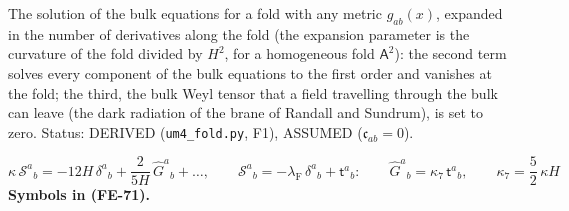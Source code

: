 \documentclass[
  10pt,
]{article}
\begin{document}
The solution of the bulk equations for a fold with any metric
\(\hat g_{ab}(x)\), expanded in the number of derivatives along the fold
(the expansion parameter is the curvature of the fold divided by
\(H^2\), for a homogeneous fold \(\mathsf{A}^2\)): the second term
solves every component of the bulk equations to the first order and
vanishes at the fold; the third, the bulk Weyl tensor that a field
travelling through the bulk can leave (the dark radiation of the brane
of Randall and Sundrum), is set to zero. Status: DERIVED
(\texttt{um4\_fold.py}, F1), ASSUMED (\(\mathfrak{c}_{ab} = 0\)).

\[
\kappa\,\mathcal{S}^a{}_b = -12H\,\delta^a{}_b + \frac{2}{5H}\,\hat G^a{}_b + \dots,\qquad
\mathcal{S}^a{}_b = -\lambda_{\mathrm{F}}\,\delta^a{}_b + \mathsf{t}^a{}_b:\qquad
\hat G^a{}_b = \kappa_7\,\mathsf{t}^a{}_b,\qquad \kappa_7 = \frac52\,\kappa H \tag{FE-71}
\] \textbf{Symbols in (FE-71).}
\end{document}
